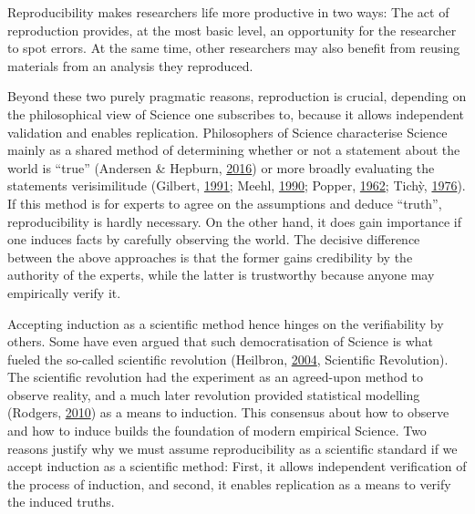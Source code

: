 \documentclass[12pt,a4paper,twoside]{article}
\begin{document}
Reproducibility makes researchers life more productive in two ways:
The act of reproduction provides, at the most basic level, an opportunity for the researcher to spot errors. At the same time, other researchers may also benefit from reusing materials from an analysis they reproduced.

Beyond these two purely pragmatic reasons, reproduction is crucial, depending on the philosophical view of Science one subscribes to, because it allows independent validation and enables replication.
Philosophers of Science characterise Science mainly as a shared method of determining whether or not a statement about the world is ``true'' (Andersen \& Hepburn, \protect\hyperlink{ref-andersonScientificMethod2016}{2016}) or more broadly evaluating the statements verisimilitude (Gilbert, \protect\hyperlink{ref-gilbertModelBuildingDefinition1991}{1991}; Meehl, \protect\hyperlink{ref-meehlAppraisingAmendingTheories1990}{1990}; Popper, \protect\hyperlink{ref-popperCommentsTruthGrowth1962}{1962}; Tichỳ, \protect\hyperlink{ref-tichyVerisimilitudeRedefined1976}{1976}).
If this method is for experts to agree on the assumptions and deduce ``truth'', reproducibility is hardly necessary.
On the other hand, it does gain importance if one induces facts by carefully observing the world.
The decisive difference between the above approaches is that the former gains credibility by the authority of the experts, while the latter is trustworthy because anyone may empirically verify it.

Accepting induction as a scientific method hence hinges on the verifiability by others.
Some have even argued that such democratisation of Science is what fueled the so-called scientific revolution (Heilbron, \protect\hyperlink{ref-heilbronOxfordCompanionHistory2004}{2004}, Scientific Revolution).
The scientific revolution had the experiment as an agreed-upon method to observe reality, and a much later revolution provided statistical modelling (Rodgers, \protect\hyperlink{ref-rodgersEpistemologyMathematicalStatistical2010}{2010}) as a means to induction.
This consensus about how to observe and how to induce builds the foundation of modern empirical Science.
Two reasons justify why we must assume reproducibility as a scientific standard if we accept induction as a scientific method:
First, it allows independent verification of the process of induction, and second, it enables replication as a means to verify the induced truths.
\end{document}
